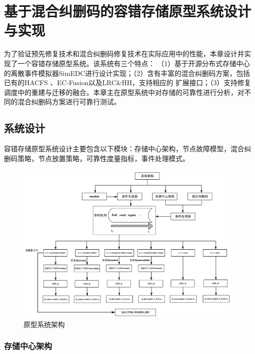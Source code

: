 \chapter{基于混合纠删码的容错存储原型系统设计与实现}
为了验证预先修复技术和混合纠删码修复技术在实际应用中的性能，本章设计并实现了一个容错存储原型系统。该系统有三个特点：
（1）基于开源分布式存储中心的离散事件模拟器SimEDC进行设计实现；（2）含有丰富的混合纠删码方案，包括已有的HACFS\cite{xia2015tale}
、EC-Fusion\cite{qiu2020ec}以及LRC\&HH\cite{wang2020adaptive}，支持相应的
扩展接口；（3）支持修复调度中的重建与迁移的融合。本章主在原型系统中对存储的可靠性进行分析，对不同的混合纠删码方案进行可靠行测试。

\section{系统设计}
容错存储原型系统设计主要包含以下模块：存储中心架构，节点故障模型，混合纠删码策略，节点放置策略，可靠性度量指标，事件处理模式。
\begin{figure}[H]
	\centering
	\includegraphics [scale=0.45]{figures/5.1.pdf}
	\caption{原型系统架构}
	\label{fig:5-3}
\end{figure}



\subsection{存储中心架构}
\label{sub:5.1.1}

